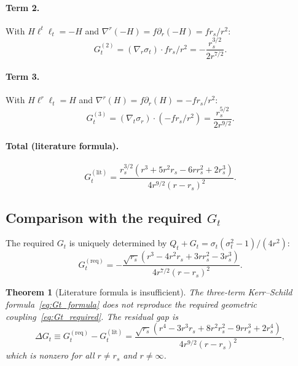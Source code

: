 \documentclass[11pt,a4paper]{article}
\theoremstyle{plain}
\newtheorem{theorem}{Theorem}[section]
\theoremstyle{definition}
\theoremstyle{remark}
\newcommand{\sigt}{\sigma_t}
\newcommand{\rs}{r_s}
\begin{document}
\paragraph{Term 2.}
With $H\ell^t\ell_t = -H$ and $\nabla^r(-H) = f\partial_r(-H) = f\rs/r^2$:
\begin{equation}
  G_t^{(2)} = (\nabla_r\sigt)\cdot f\rs/r^2
  = -\frac{\rs^{3/2}}{2r^{7/2}}.
\end{equation}

\paragraph{Term 3.}
With $H\ell^r\ell_t = H$ and $\nabla^r(H) = f\partial_r(H) = -f\rs/r^2$:
\begin{equation}
  G_t^{(3)} = (\nabla_t\sigma_r)\cdot(-f\rs/r^2)
  = \frac{\rs^{5/2}}{2r^{9/2}}.
\end{equation}

\paragraph{Total (literature formula).}
\begin{equation}\label{eq:Gt_lit}
  G_t^{(\mathrm{lit})} = \frac{\rs^{3/2}(r^3+5r^2\rs-6r\rs^2+2\rs^3)}
                              {4r^{9/2}(r-\rs)^2}.
\end{equation}

\subsection{Comparison with the required $G_t$}

The required $G_t$ is uniquely determined by $Q_t + G_t = \sigt(\sigt^2-1)/(4r^2)$:
\begin{equation}\label{eq:Gt_required}
  G_t^{(\mathrm{req})} = -\frac{\sqrt{\rs}(r^3-4r^2\rs+3r\rs^2-3\rs^3)}
                               {4r^{7/2}(r-\rs)^2}.
\end{equation}

\begin{theorem}[Literature formula is insufficient]\label{thm:Gt}
The three-term Kerr--Schild formula~\eqref{eq:Gt_formula} does not
reproduce the required geometric coupling~\eqref{eq:Gt_required}.
The residual gap is
\begin{equation}\label{eq:Gt_gap}
  \Delta G_t \equiv G_t^{(\mathrm{req})} - G_t^{(\mathrm{lit})}
  = \frac{\sqrt{\rs}(r^4-3r^3\rs+8r^2\rs^2-9r\rs^3+2\rs^4)}
         {4r^{9/2}(r-\rs)^2},
\end{equation}
which is nonzero for all $r \ne \rs$ and $r \ne \infty$.
\end{theorem}
\end{document}
